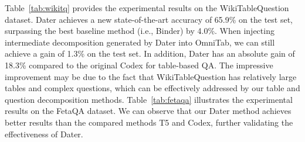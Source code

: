 \documentclass{article}
\begin{document}
Table~\ref{tab:wikitq} provides the experimental results on the WikiTableQuestion dataset. 
Dater achieves a new state-of-the-art accuracy of 65.9\% on the test set, surpassing the best baseline method (i.e., Binder) by 4.0\%.
When injecting intermediate decomposition generated by Dater into OmniTab, we can still achieve a gain of 1.3\% on the test set. 
In addition, Dater has an absolute gain of 18.3\% compared to the original Codex for table-based QA. The impressive improvement may be due to the fact that WikiTableQuestion has relatively large tables and complex questions, which can be effectively addressed by our table and question decomposition methods.
Table~\ref{tab:fetaqa} illustrates the experimental results on the FetaQA dataset.
We can observe that our Dater method achieves better results than the compared methods T5 and Codex, further validating the effectiveness of Dater.

\begin{table*}
\centering
    \caption{Ablation results on the test sets of the three datasets.}
    \label{tab:main-ab}
\end{table*}
\end{document}
